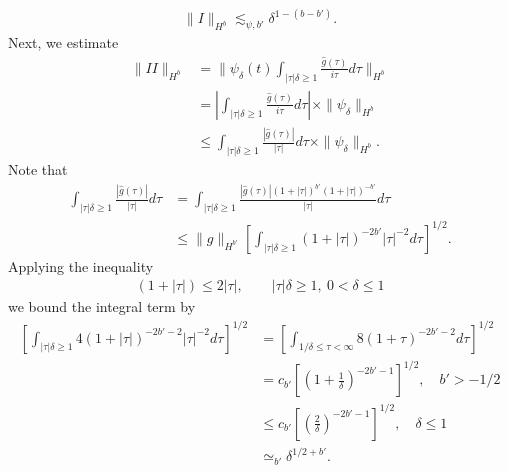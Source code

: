 \documentclass[12pt,reqno]{amsart}
\numberwithin{equation}{section}  %
\newcommand{\wh}{\widehat}
\begin{document}
\begin{appendices}
\begin{equation}
\begin{split}
  \| I \|_{H^{b}} \lesssim_{\psi, b'} \delta^{1 - (b - b')}.
\end{split}
\label{rom-1}
\end{equation}
%
%
Next, we estimate
%
%
\begin{equation}
  \label{est-II}
\begin{split}
  \| II \|_{H^{b}}
  & = \| \psi_{\delta}(t) \int_{| \tau |\delta \ge 1} \frac{\wh{g}(\tau)}{i
  \tau} d \tau \|_{H^{b}}
  \\
  & = | \int_{| \tau | \delta \ge 1} \frac{\wh{g}(\tau)}{i \tau} d \tau | \times \| \psi_{\delta}
  \|_{H^{b}}
  \\
  & \le \int_{| \tau |\delta \ge 1} \frac{| \wh{g}(\tau)|}{|\tau|} d \tau  \times \| \psi_{\delta}
  \|_{H^{b}}.
\end{split}
\end{equation}
%
%
Note that 
%
%
\begin{equation*}
\begin{split}
\int_{| \tau |\delta \ge 1} \frac{| \wh{g}(\tau)|}{|\tau|} d \tau 
& = \int_{| \tau |\delta \ge 1} \frac{| \wh{g}(\tau)| (1 + | \tau |)^{b'} (1 + | \tau
|)^{-b'}}{|\tau|} d \tau 
\\
& \le \|g\|_{H^{b'}} \left[ \int_{| \tau | \delta \ge 1} (1 + | \tau |)^{-2b'} | \tau
|^{-2} d \tau \right]^{1/2}.
\end{split}
\end{equation*}
%
%
Applying the inequality 
%
%
\begin{equation}
  \label{sob-term-bound}
\begin{split}
(1 + | \tau |) \le 2 | \tau |, \qquad | \tau |\delta \ge 1, \ 0 < \delta \le 1
\end{split}
\end{equation}
we bound the integral term by
%
%
%
%
\begin{equation*}
\begin{split}
\left[ \int_{| \tau | \delta \ge 1} 4 (1 + | \tau |)^{-2b'-2} | \tau
|^{-2} d \tau \right]^{1/2}
& = \left[ \int_{1/\delta \le  \tau < \infty} 8 (1 +  \tau )^{-2b'-2} 
d \tau \right]^{1/2}
\\
& = c_{b'} \left [ \left( 1 + \frac{1}{\delta} \right)^{-2b' -1} \right ] ^{1/2}, \quad b'> -1/2
\\
& \le c_{b'} \left [ \left (\frac{2}{\delta} \right )^{-2b' -1} \right ]^{1/2}, \quad \delta \le 1
\\
& \simeq_{b'} \delta^{1/2 + b'}.
\end{split}

\end{equation*}
\end{appendices}
\end{document}
